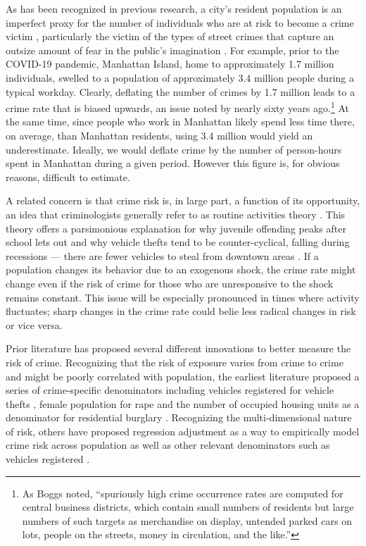 As has been recognized in previous research, a city's resident population is an imperfect proxy for the number of individuals who are at risk to become a crime victim \citep{boggs1965urban, boydell1969demographic, skogan1978victimization, stipak1988alternatives, newton2018macro,gerell2021does, vaughan2020promise, ramos2021improving}, particularly the victim of the types of street crimes that capture an outsize amount of fear in the public's imagination \citep{skogan1986fear, ferraro1987measurement}. For example, prior to the COVID-19 pandemic, Manhattan Island, home to approximately 1.7 million individuals, swelled to a population of approximately 3.4 million people during a typical workday. Clearly, deflating the number of crimes by 1.7 million leads to a crime rate that is biased upwards, an issue noted by \citeauthor{boggs1965urban} nearly sixty years ago.\footnote{As Boggs noted, ``spuriously high crime occurrence rates are computed for central business districts, which contain small numbers of residents but large numbers of such targets as merchandise on display, untended parked cars on lots, people on the streets, money in circulation, and the like.''}
At the same time, since people who work in Manhattan likely spend less time there, on average, than Manhattan residents, using 3.4 million would yield an underestimate. Ideally, we would deflate crime by the number of person-hours spent in Manhattan during a given period. However this figure is, for obvious reasons, difficult to estimate.

A related concern is that crime risk is, in large part, a function of its opportunity, an idea that criminologists generally refer to as routine activities theory \citep{cohen1979social, felson1987routine, branic2015routine}. This theory offers a parsimonious explanation for why juvenile offending peaks after school lets out \citep{fox1997after, fischer2018juvenile} and why vehicle thefts tend to be counter-cyclical, falling during recessions --- there are fewer vehicles to steal from downtown areas \citep{cook1985crime,bushway2012overall}. If a population changes its behavior due to an exogenous shock, the crime rate might change even if the risk of crime for those who are unresponsive to the shock remains constant. This issue will be especially pronounced in times where activity fluctuates; sharp changes in the crime rate could belie less radical changes in risk or vice versa. 

Prior literature has proposed several different innovations to better measure the risk of crime. Recognizing that the risk of exposure varies from crime to crime and might be poorly correlated with population, the earliest literature proposed a series of crime-specific denominators including vehicles registered for vehicle thefts \citep{lottier1938distribution, cohen1985risk}, female population for rape \citep{boggs1965urban} and the number of occupied housing units as a denominator for residential
burglary \citep{boggs1965urban, minnesota1977crime}. Recognizing the multi-dimensional nature of risk, others have proposed regression adjustment as a way to empirically model crime risk across population as well as other relevant denominators such as vehicles registered \citep{stipak1988alternatives}. 

